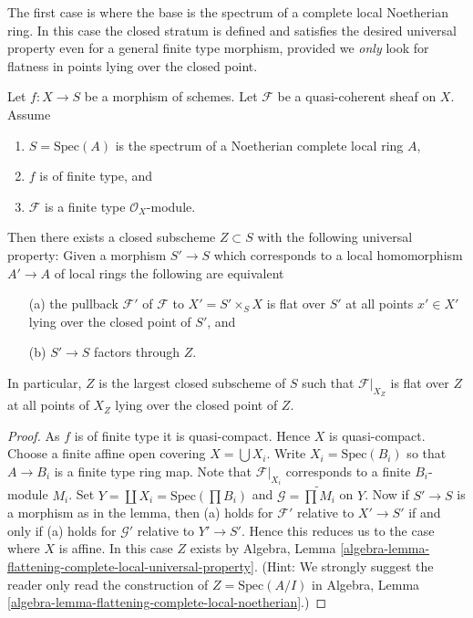 \medskip\noindent
The first case is where the base is the spectrum of a complete
local Noetherian ring. In this case the closed stratum is defined
and satisfies the desired universal property even for a general
finite type morphism, provided we {\it only} look for flatness in
points lying over the closed point.

\begin{lemma}
\label{lemma-flattening-complete-noetherian}
Let $f : X \to S$ be a morphism of schemes.
Let $\mathcal{F}$ be a quasi-coherent sheaf on $X$.
Assume
\begin{enumerate}
\item $S = \text{Spec}(A)$ is the spectrum of a Noetherian complete
local ring $A$,
\item $f$ is of finite type, and
\item $\mathcal{F}$ is a finite type $\mathcal{O}_X$-module.
\end{enumerate}
Then there exists a closed subscheme $Z \subset S$ with the following
universal property: Given a morphism $S' \to S$ which corresponds to
a local homomorphism $A' \to A$ of local rings the following
are equivalent
\begin{enumerate}
\item[(a)] the pullback $\mathcal{F}'$ of $\mathcal{F}$ to
$X' = S' \times_S X$ is flat over $S'$ at all points $x' \in X'$
lying over the closed point of $S'$, and
\item[(b)] $S' \to S$ factors through $Z$.
\end{enumerate}
In particular, $Z$ is the largest closed subscheme of $S$ such that
$\mathcal{F}|_{X_Z}$ is flat over $Z$ at all points
of $X_Z$ lying over the closed point of $Z$.
\end{lemma}

\begin{proof}
As $f$ is of finite type it is quasi-compact. Hence $X$ is quasi-compact.
Choose a finite affine open covering $X = \bigcup X_i$.
Write $X_i = \text{Spec}(B_i)$ so that $A \to B_i$ is a finite type
ring map. Note that $\mathcal{F}|_{X_i}$ corresponds to a finite
$B_i$-module $M_i$. Set $Y = \coprod X_i = \text{Spec}(\prod B_i)$
and $\mathcal{G} = \widetilde{\prod M_i}$ on $Y$.
Now if $S' \to S$ is a morphism as in the lemma, then (a) holds
for $\mathcal{F}'$ relative to $X' \to S'$ if and only if (a) holds for
$\mathcal{G}'$ relative to $Y' \to S'$. Hence this
reduces us to the case where $X$ is affine.
In this case $Z$ exists by
Algebra,
Lemma \ref{algebra-lemma-flattening-complete-local-universal-property}.
(Hint: We strongly suggest the reader only read the construction of
$Z = \text{Spec}(A/I)$ in
Algebra, Lemma \ref{algebra-lemma-flattening-complete-local-noetherian}.)
\end{proof}












